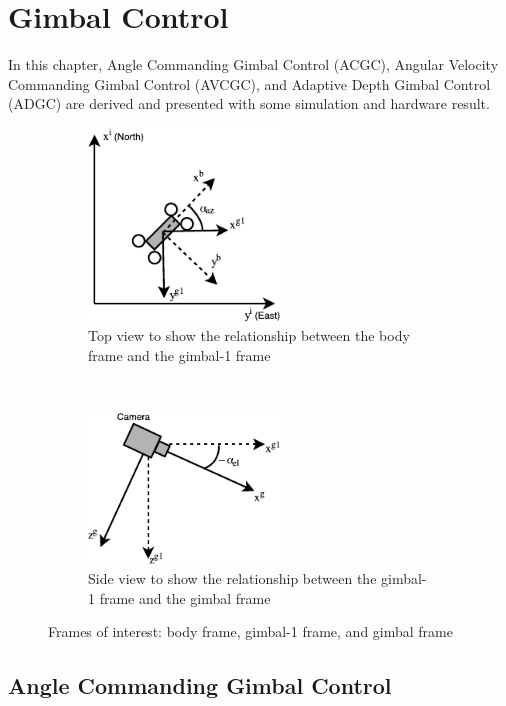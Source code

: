 \chapter{Gimbal Control}
\label{chapter2}
\graphicspath{{figures/}{figures/chapter2/}}

In this chapter, Angle Commanding Gimbal Control (ACGC), Angular Velocity Commanding Gimbal Control (AVCGC), and Adaptive Depth Gimbal Control (ADGC) are derived and presented with some simulation and hardware result.

\begin{figure}[htbp]
    \centering
    \begin{subfigure}[t]{0.5\textwidth}
    	\centering
    	\includegraphics[width=2in]{images/chapter2/gimbal1_frame}
    	\caption{Top view to show the relationship between the body frame and the gimbal-1 frame}
    \end{subfigure}%
    ~
    \begin{subfigure}[t]{0.5\textwidth}
    	\centering
    	\includegraphics[width=2in]{images/chapter2/gimbal_frame}
    	\caption{Side view to show the relationship between the gimbal-1 frame and the gimbal frame}
    \end{subfigure}
    \caption{Frames of interest: body frame, gimbal-1 frame, and gimbal frame}
    \label{gimbal_frame}
\end{figure}

\section{Angle Commanding Gimbal Control}
